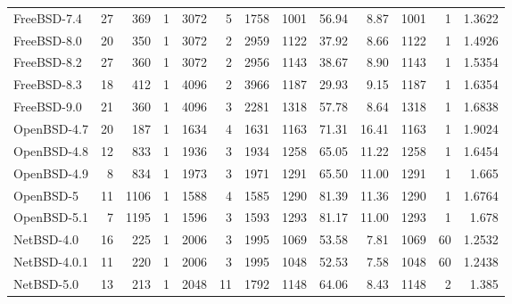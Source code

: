 \documentclass[11pt]{article}
\begin{document}
\begin{center}
\begin{tabular}{lrrrrrrrrrrrr}
\hline
\hline
 FreeBSD-7.4            &     27  &     369  &                  1  &     3072  &     5  &      1758  &       1001  &    56.94  &     8.87  &    1001  &    1  &   1.3622  \\
 FreeBSD-8.0            &     20  &     350  &                  1  &     3072  &     2  &      2959  &       1122  &    37.92  &     8.66  &    1122  &    1  &   1.4926  \\
 FreeBSD-8.2            &     27  &     360  &                  1  &     3072  &     2  &      2956  &       1143  &    38.67  &     8.90  &    1143  &    1  &   1.5354  \\
 FreeBSD-8.3            &     18  &     412  &                  1  &     4096  &     2  &      3966  &       1187  &    29.93  &     9.15  &    1187  &    1  &   1.6354  \\
 FreeBSD-9.0            &     21  &     360  &                  1  &     4096  &     3  &      2281  &       1318  &    57.78  &     8.64  &    1318  &    1  &   1.6838  \\
 OpenBSD-4.7            &     20  &     187  &                  1  &     1634  &     4  &      1631  &       1163  &    71.31  &    16.41  &    1163  &    1  &   1.9024  \\
 OpenBSD-4.8            &     12  &     833  &                  1  &     1936  &     3  &      1934  &       1258  &    65.05  &    11.22  &    1258  &    1  &   1.6454  \\
 OpenBSD-4.9            &      8  &     834  &                  1  &     1973  &     3  &      1971  &       1291  &    65.50  &    11.00  &    1291  &    1  &    1.665  \\
 OpenBSD-5              &     11  &    1106  &                  1  &     1588  &     4  &      1585  &       1290  &    81.39  &    11.36  &    1290  &    1  &   1.6764  \\
 OpenBSD-5.1            &      7  &    1195  &                  1  &     1596  &     3  &      1593  &       1293  &    81.17  &    11.00  &    1293  &    1  &    1.678  \\
 NetBSD-4.0             &     16  &     225  &                  1  &     2006  &     3  &      1995  &       1069  &    53.58  &     7.81  &    1069  &   60  &   1.2532  \\
 NetBSD-4.0.1           &     11  &     220  &                  1  &     2006  &     3  &      1995  &       1048  &    52.53  &     7.58  &    1048  &   60  &   1.2438  \\
 NetBSD-5.0             &     13  &     213  &                  1  &     2048  &    11  &      1792  &       1148  &    64.06  &     8.43  &    1148  &    2  &    1.385  \\

\end{tabular}
\end{center}
\end{document}
